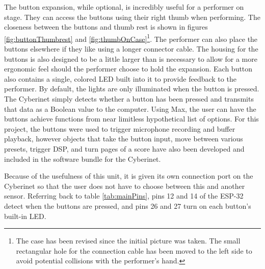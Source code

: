 The button expansion, while optional, is incredibly useful for a performer on stage. They can access the buttons using their right thumb when performing. The closeness between the buttons and thumb rest is shown in figures \ref{fig:buttonThumbrest} and \ref{fig:thumbOnCase}\footnote{The case has been revised since the initial picture was taken. The small rectangular hole for the connection cable has been moved to the left side to avoid potential collisions with the performer's hand.}. The performer can also place the buttons elsewhere if they like using a longer connector cable. The housing for the buttons is also designed to be a little larger than is necessary to allow for a more ergonomic feel should the performer choose to hold the expansion. Each button also contains a single, colored LED built into it to provide feedback to the performer. By default, the lights are only illuminated when the button is pressed. The Cyberinet simply detects whether a button has been pressed and transmits that data as a Boolean value to the computer. Using Max, the user can have the buttons achieve functions from near limitless hypothetical list of options. For this project, the buttons were used to trigger microphone recording and buffer playback, however objects that take the button input, move between various presets, trigger DSP, and turn pages of a score have also been developed and included in the software bundle for the Cyberinet.

Because of the usefulness of this unit, it is given its own connection port on the Cyberinet so that the user does not have to choose between this and another sensor. Referring back to table \ref{tab:mainPins}, pins 12 and 14 of the ESP-32 detect when the buttons are pressed, and pins 26 and 27 turn on each button's built-in LED.


